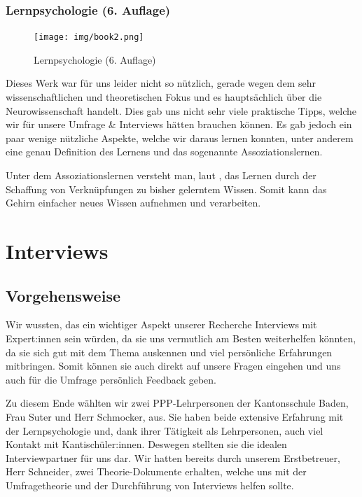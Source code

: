\documentclass[12pt,a4paper]{report}
\begin{document}
\subsubsection{Lernpsychologie (6. Auflage)}
\begin{figure}[H]
    \centering
    \texttt{[image: img/book2.png]}
    \caption{Lernpsychologie (6. Auflage)}
\end{figure}


Dieses Werk war für uns leider nicht so nützlich, gerade wegen dem sehr wissenschaftlichen und theoretischen Fokus und es hauptsächlich über die Neurowissenschaft handelt.
Dies gab uns nicht sehr viele praktische Tipps, welche wir für unsere Umfrage \& Interviews hätten brauchen können. 
Es gab jedoch ein paar wenige nützliche Aspekte, welche wir daraus lernen konnten, unter anderem eine genau Definition des Lernens und das sogenannte Assoziationslernen.

Unter dem Assoziationslernen versteht man, laut \textcite{Book2}, das Lernen durch der Schaffung von Verknüpfungen zu bisher gelerntem Wissen. 
Somit kann das Gehirn einfacher neues Wissen aufnehmen und verarbeiten.

\section{Interviews}

\subsection {Vorgehensweise}
Wir wussten, das ein wichtiger Aspekt unserer Recherche Interviews mit Expert:innen sein würden, da sie uns vermutlich am Besten weiterhelfen könnten, da sie sich gut mit dem Thema auskennen und viel persönliche Erfahrungen mitbringen.
Somit können sie auch direkt auf unsere Fragen eingehen und uns auch für die Umfrage persönlich Feedback geben. 

Zu diesem Ende wählten wir zwei PPP-Lehrpersonen der Kantonsschule Baden, Frau Suter und Herr Schmocker, aus. Sie haben beide extensive Erfahrung mit der Lernpsychologie und, dank ihrer Tätigkeit als Lehrpersonen, auch viel Kontakt mit Kantischüler:innen.
Deswegen stellten sie die idealen Interviewpartner für uns dar. Wir hatten bereits durch unserem Erstbetreuer, Herr Schneider, zwei Theorie-Dokumente erhalten, welche uns mit der Umfragetheorie und der Durchführung von Interviews helfen sollte.
\end{document}
